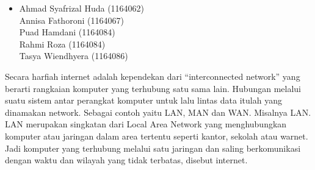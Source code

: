 \documentclass[12pt, a4paper]{article}
\begin{document}
\begin{itemize}
        \item
        Ahmad Syafrizal Huda (1164062) \\
        Annisa Fathoroni (1164067) \\
        Puad Hamdani (1164084) \\
        Rahmi Roza (1164084) \\
        Tasya Wiendhyera (1164086) \\
\end{itemize}
    Secara harfiah internet adalah kependekan dari “interconnected network” yang berarti rangkaian komputer yang terhubung satu sama lain. Hubungan melalui suatu sistem antar perangkat komputer untuk lalu lintas data itulah yang dinamakan network. Sebagai contoh yaitu LAN, MAN dan WAN. Misalnya LAN. LAN merupakan singkatan dari Local Area Network yang menghubungkan komputer atau jaringan dalam area tertentu seperti kantor, sekolah atau warnet. Jadi komputer yang terhubung melalui satu jaringan dan saling berkomunikasi dengan waktu dan wilayah yang tidak terbatas, disebut internet.
\end{document}
